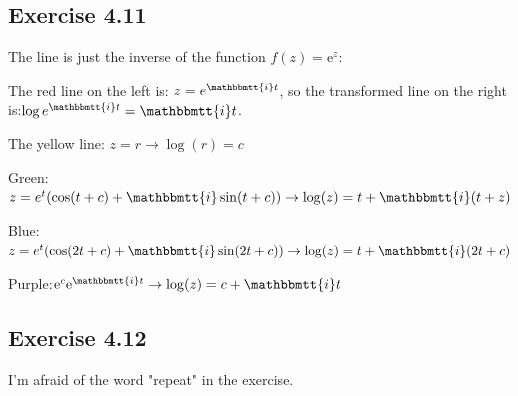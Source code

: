 \documentclass[]{ctexart}
\newcommand{\mi}{\mathbbmtt{i}}
\newcommand{\me}{\mathrm{e}}
\begin{document}
	\subsection{Exercise 4.11}
		The line is just the inverse of the function $f(z)=\me ^z$:
		
		The red line on the left is: $z=e^{\mi t}$, so the transformed line on the right is:$\log{e^{\mi t}}=\mi t $.
		
		The yellow line: $z=r\rightarrow \log(r)=c$
		
		Green: $z=e^{t}(\cos(t+c)+\mi \sin(t+c))\rightarrow \log(z)=t+\mi (t+z)$
		
		Blue:$z=e^{t}(\cos(2t+c)+\mi \sin (2t+c))\rightarrow \log(z)=t+\mi (2t+c)$
		
		Purple:$\me^c\me ^{\mi t}\rightarrow \log(z)=c+\mi t$
		
	\subsection{Exercise 4.12}
		I'm afraid of the word "repeat" in the exercise. 
\end{document}
